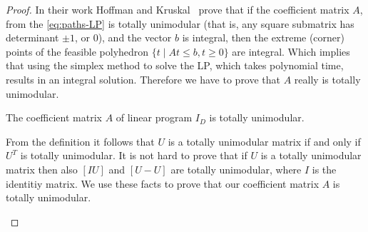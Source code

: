 \documentclass[a4paper,UKenglish,cleveref, autoref, thm-restate]{lipics-v2021}
\begin{document}
\begin{proof}
In their work Hoffman and Kruskal~\cite{Hoffman1956Integral} prove that if the coefficient matrix  $A$, from the \cref{eq:paths-LP} is totally unimodular (that is, any square submatrix has determinant $\pm 1$, or $0$), and the vector $b$ is integral,
then the extreme (corner) points of the feasible polyhedron $\{ t \mid A t  \leq b, t \geq 0\}$ are integral. 
Which implies that using the simplex method to solve the LP, which takes polynomial time, results in an integral solution.
Therefore we have to prove that $A$ really is totally unimodular.

\begin{claim}
    The coefficient matrix $A$ of linear program $I_D$ is totally unimodular.
\end{claim}

\begin{claimproof}
    From the definition it follows that $U$ is a totally unimodular matrix if and only if $U^T$ is totally unimodular.
    It is not hard to prove that if $U$ is a totally unimodular matrix then also $[I U]$ and $[U -U]$ are totally unimodular, where $I$ is the identitiy matrix.
    We use these facts to prove that our coefficient matrix $A$ is totally unimodular.


\end{claimproof}
\end{proof}
\end{document}
